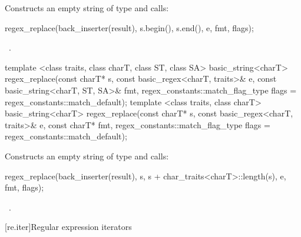 \begin{itemdescr}
\pnum\effects  Constructs an empty string  of
type  and calls:
\begin{codeblock}
regex_replace(back_inserter(result), s.begin(), s.end(), e, fmt, flags);
\end{codeblock}

\pnum
\returns\ .
\end{itemdescr}

%
\begin{itemdecl}
template <class traits, class charT, class ST, class SA>
  basic_string<charT>
  regex_replace(const charT* s,
                const basic_regex<charT, traits>& e,
                const basic_string<charT, ST, SA>& fmt,
                regex_constants::match_flag_type flags =
                  regex_constants::match_default);
template <class traits, class charT>
  basic_string<charT>
  regex_replace(const charT* s,
                const basic_regex<charT, traits>& e,
                const charT* fmt,
                regex_constants::match_flag_type flags =
                  regex_constants::match_default);
\end{itemdecl}

\begin{itemdescr}
\pnum
\effects  Constructs an empty string  of
type  and calls:
\begin{codeblock}
regex_replace(back_inserter(result),
              s, s + char_traits<charT>::length(s), e, fmt, flags);
\end{codeblock}

\pnum
\returns\ .
\end{itemdescr}

[re.iter]{Regular expression iterators}

